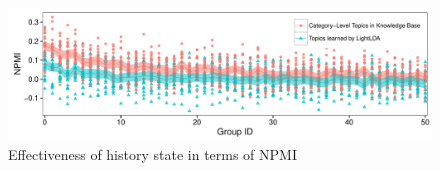 \documentclass{article}
\begin{document}
\begin{figure}
        \centering
        \includegraphics[width=1.0\columnwidth]{img/NPMI.pdf}
        \caption{Effectiveness of history state in terms of NPMI}
        \label{fig:NPMI}
\end{figure}

\end{document}
